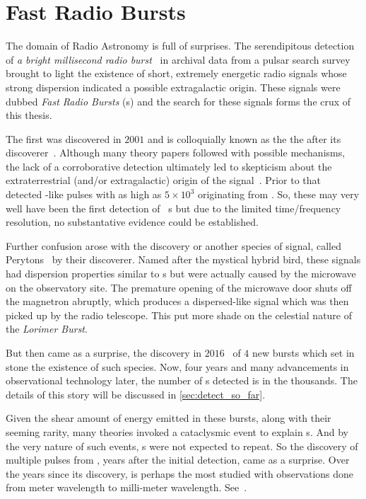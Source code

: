 \chapter{Fast Radio Bursts}\label{ch:frb}

\par The domain of Radio Astronomy is full of surprises. 
The serendipitous detection of \emph{a bright millisecond radio burst}~\cite{first_frb} in archival data from a pulsar search survey brought to light the existence of short, extremely energetic radio signals whose strong dispersion indicated a possible extragalactic origin. 
These signals were dubbed \emph{Fast Radio Bursts} (\frb{}s) and the search for these signals forms the crux of this thesis.

\par The first \frb{} was discovered in $2001$ and is colloquially known as the the  after its discoverer~\cite{lorimerburst}. 
Although many theory papers followed with possible mechanisms, the lack of a corroborative detection ultimately led to skepticism about the extraterrestrial (and/or extragalactic) origin of the signal~\cite{burke_doubt}. 
Prior to that~\cite{old_m87_bursts} detected \frb-like pulses with \dm{} as high as $5\times 10^3$ \pc originating from . So, these may very well have been the first detection of \frb~s but due to the limited time/frequency resolution, no substantative evidence could be established. 

\par Further confusion arose with the discovery or another species of signal, called Perytons~\cite{perytons} by their discoverer.  Named after the mystical hybrid bird, these signals had dispersion properties similar to \frb{}s but were actually caused by the microwave on the observatory site. The premature opening of the microwave door shuts off the magnetron abruptly, which produces a dispersed-like signal which was then picked up by the radio telescope.
This put more shade on the celestial nature of the \emph{Lorimer Burst}.

\par But then came as a surprise, the discovery in $2016$~\cite{danburst4} of $4$ new bursts which set in stone the existence of such species. 
Now, four years and many advancements in observational technology later, the number of \frb{}s detected is in the thousands. The details of this story will be discussed in \autoref{sec:detect_so_far}.

\par Given the shear amount of energy emitted in these bursts, along with their seeming rarity, many theories invoked a cataclysmic event to explain \frb{}s. And by the very nature of such events, \frb{}s were not expected to repeat. So the discovery of multiple pulses from , years after the initial detection, came as a surprise.
Over the years since its discovery,  is perhaps the most studied \frb{} with observations done from meter wavelength to milli-meter wavelength. See~\cite{sptlier}.

